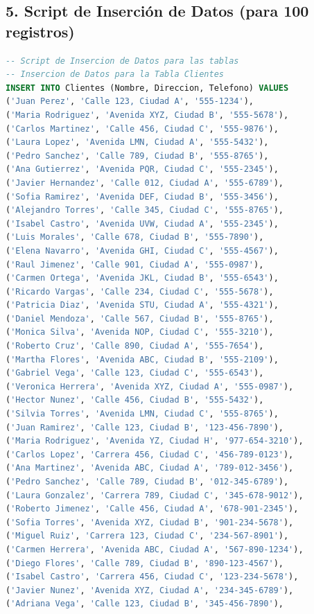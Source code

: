 \documentclass[12pt]{article}
\begin{document}
    \subsection*{5. Script de Inserción de Datos (para 100 registros)}
    \begin{lstlisting}[language=SQL]
-- Script de Insercion de Datos para las tablas 
-- Insercion de Datos para la Tabla Clientes
INSERT INTO Clientes (Nombre, Direccion, Telefono) VALUES
('Juan Perez', 'Calle 123, Ciudad A', '555-1234'),
('Maria Rodriguez', 'Avenida XYZ, Ciudad B', '555-5678'),
('Carlos Martinez', 'Calle 456, Ciudad C', '555-9876'),
('Laura Lopez', 'Avenida LMN, Ciudad A', '555-5432'),
('Pedro Sanchez', 'Calle 789, Ciudad B', '555-8765'),
('Ana Gutierrez', 'Avenida PQR, Ciudad C', '555-2345'),
('Javier Hernandez', 'Calle 012, Ciudad A', '555-6789'),
('Sofia Ramirez', 'Avenida DEF, Ciudad B', '555-3456'),
('Alejandro Torres', 'Calle 345, Ciudad C', '555-8765'),
('Isabel Castro', 'Avenida UVW, Ciudad A', '555-2345'),
('Luis Morales', 'Calle 678, Ciudad B', '555-7890'),
('Elena Navarro', 'Avenida GHI, Ciudad C', '555-4567'),
('Raul Jimenez', 'Calle 901, Ciudad A', '555-0987'),
('Carmen Ortega', 'Avenida JKL, Ciudad B', '555-6543'),
('Ricardo Vargas', 'Calle 234, Ciudad C', '555-5678'),
('Patricia Diaz', 'Avenida STU, Ciudad A', '555-4321'),
('Daniel Mendoza', 'Calle 567, Ciudad B', '555-8765'),
('Monica Silva', 'Avenida NOP, Ciudad C', '555-3210'),
('Roberto Cruz', 'Calle 890, Ciudad A', '555-7654'),
('Martha Flores', 'Avenida ABC, Ciudad B', '555-2109'),
('Gabriel Vega', 'Calle 123, Ciudad C', '555-6543'),
('Veronica Herrera', 'Avenida XYZ, Ciudad A', '555-0987'),
('Hector Nunez', 'Calle 456, Ciudad B', '555-5432'),
('Silvia Torres', 'Avenida LMN, Ciudad C', '555-8765'),
('Juan Ramirez', 'Calle 123, Ciudad B', '123-456-7890'),
('Maria Rodriguez', 'Avenida YZ, Ciudad H', '977-654-3210'),
('Carlos Lopez', 'Carrera 456, Ciudad C', '456-789-0123'),
('Ana Martinez', 'Avenida ABC, Ciudad A', '789-012-3456'),
('Pedro Sanchez', 'Calle 789, Ciudad B', '012-345-6789'),
('Laura Gonzalez', 'Carrera 789, Ciudad C', '345-678-9012'),
('Roberto Jimenez', 'Calle 456, Ciudad A', '678-901-2345'),
('Sofia Torres', 'Avenida XYZ, Ciudad B', '901-234-5678'),
('Miguel Ruiz', 'Carrera 123, Ciudad C', '234-567-8901'),
('Carmen Herrera', 'Avenida ABC, Ciudad A', '567-890-1234'),
('Diego Flores', 'Calle 789, Ciudad B', '890-123-4567'),
('Isabel Castro', 'Carrera 456, Ciudad C', '123-234-5678'),
('Javier Nunez', 'Avenida XYZ, Ciudad A', '234-345-6789'),
('Adriana Vega', 'Calle 123, Ciudad B', '345-456-7890'),

\end{lstlisting}
\end{document}
